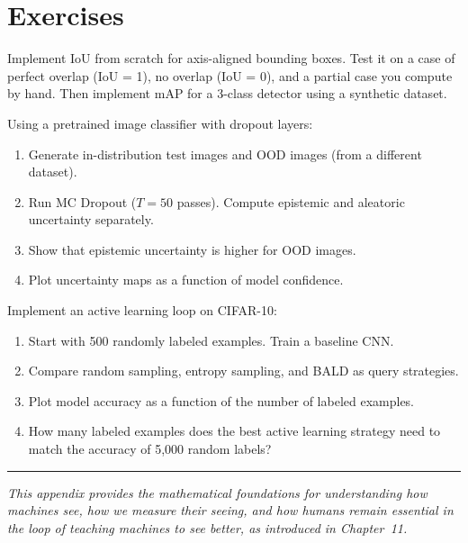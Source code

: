 \section{Exercises}

\begin{Exercise}
Implement IoU from scratch for axis-aligned bounding boxes. Test it on a case of perfect overlap (IoU = 1), no overlap (IoU = 0), and a partial case you compute by hand. Then implement mAP for a 3-class detector using a synthetic dataset.
\end{Exercise}

\begin{Exercise}
Using a pretrained image classifier with dropout layers:
\begin{enumerate}
    \item Generate in-distribution test images and OOD images (from a different dataset).
    \item Run MC Dropout ($T = 50$ passes). Compute epistemic and aleatoric uncertainty separately.
    \item Show that epistemic uncertainty is higher for OOD images.
    \item Plot uncertainty maps as a function of model confidence.
\end{enumerate}
\end{Exercise}

\begin{Exercise}
Implement an active learning loop on CIFAR-10:
\begin{enumerate}
    \item Start with 500 randomly labeled examples. Train a baseline CNN.
    \item Compare random sampling, entropy sampling, and BALD as query strategies.
    \item Plot model accuracy as a function of the number of labeled examples.
    \item How many labeled examples does the best active learning strategy need to match the accuracy of 5{,}000 random labels?
\end{enumerate}
\end{Exercise}

\bigskip
\begin{center}
\rule{0.5\textwidth}{0.4pt}
\end{center}
\bigskip

\noindent\textit{This appendix provides the mathematical foundations for understanding how machines see, how we measure their seeing, and how humans remain essential in the loop of teaching machines to see better, as introduced in Chapter~11.}
\apxnumoff
